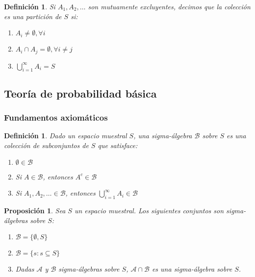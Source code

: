\documentclass[14pt]{extarticle}
\newtheorem{proposition}[theorem]{Proposición}
\newtheorem{definition}[theorem]{Definición}
\begin{document}
\begin{definition}
    Si $A_1, A_2, \ldots$ son mutuamente excluyentes, decimos que la colección es una partición de $S$ si:
    \begin{enumerate}
        \item $A_i \neq \emptyset, \forall i$
        \item $A_i \cap A_j = \emptyset, \forall i \neq j$
        \item $\bigcup_{i=1}^\infty A_i = S$
    \end{enumerate}
\end{definition}

\subsection{Teoría de probabilidad básica}
\subsubsection{Fundamentos axiomáticos}
\begin{definition}
    Dado un espacio muestral $S$, una sigma-álgebra $\mathcal{B}$ sobre $S$ es una colección de
     subconjuntos de $S$ que satisface:
    \begin{enumerate}
        \item $\emptyset \in \mathcal{B}$
        \item Si $A \in \mathcal{B}$, entonces $A^c \in \mathcal{B}$
        \item Si $A_1, A_2, \ldots \in \mathcal{B}$, entonces $\bigcup_{i=1}^\infty A_i \in \mathcal{B}$
    \end{enumerate}
\end{definition}

\begin{proposition}
    Sea $S$ un espacio muestral. Los siguientes conjuntos son sigma-álgebras sobre $S$:
    \begin{enumerate}
        \item $\mathcal{B} = \{\emptyset, S\}$
        \item $\mathcal{B} = \{s: s \subseteq S\}$
        \item Dadas $\mathcal{A}$ y $\mathcal{B}$ sigma-álgebras sobre $S$, $\mathcal{A} \cap \mathcal{B}$ es una sigma-álgebra sobre $S$.
    \end{enumerate}
\end{proposition}
\end{document}
